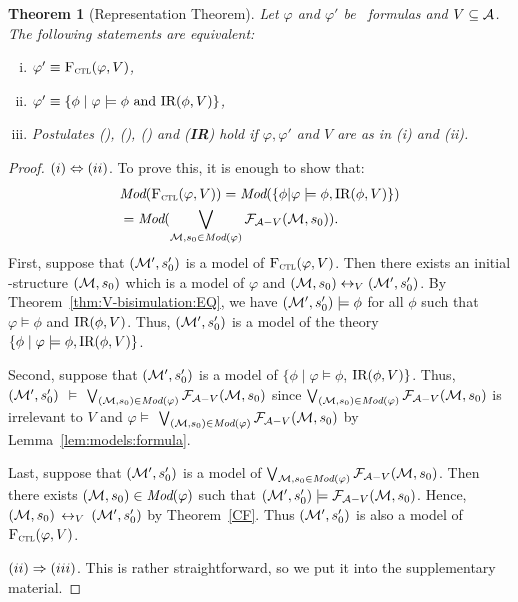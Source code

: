 \documentclass{article}
\newtheorem{theorem}{Theorem}
\begin{document}
\begin{theorem}[Representation Theorem]\label{thm:close}
Let $\varphi$ and $\varphi'$ be \CTL\ formulas and $V \subseteq {\cal A}$.
The following statements are equivalent:
\begin{enumerate}[(i)]
  \item $\varphi' \equiv {\textsc{F}_{\textsc{ctl}}}(\varphi, V)$,
  \item $\varphi'\equiv \{\phi \mid\varphi \models \phi \text{ and } \textrm{IR}(\phi, V)\}$,
  \item Postulates (\W), (\PP), (\NgP) and (\textbf{IR}) hold if $\varphi,   \varphi'$ and $V$ are as in (i) and (ii).
\end{enumerate}
\end{theorem}
\begin{proof}
$(i) \Leftrightarrow (ii)$. To prove this, it is enough to show that:
\begin{align*}
 & \textit{Mod}({\textsc{F}_{\textsc{ctl}}}(\varphi, V)) = \textit{Mod}(\{\phi | \varphi \models \phi, \textrm{IR}(\phi, V)\})\\
 & = \textit{Mod}(\bigvee_{{\cal M}, s_0\in \textit{Mod}(\varphi)} {\cal F}_{{\cal A}- V}({\cal M}, s_0)).
\end{align*}
First, suppose that $({\cal M}', s_0')$ is a model of ${\textsc{F}_{\textsc{ctl}}}(\varphi, V)$. Then there exists an initial \MPK-structure $({\cal M}, s_0)$ which is a model of $\varphi$ and $({\cal M}, s_0) \leftrightarrow_V ({\cal M}', s_0')$. By Theorem~\ref{thm:V-bisimulation:EQ}, we have $({\cal M}', s_0') \models \phi$ for all $\phi$ such that $\varphi\models \phi$ and $\textrm{IR}(\phi, V)$. Thus, $({\cal M}', s_0')$ is a model of the theory $\{\phi \mid \varphi \models \phi, \textrm{IR}(\phi, V)\}$.

Second, suppose that $({\cal M}', s_0')$ is a model of $\{\phi \mid \varphi \models \phi$, $\textrm{IR}(\phi, V)\}$. Thus, $({\cal M}', s_0')$ $\models$ $\bigvee_{({\cal M}, s_0)\in \textit{Mod}(\varphi)} {\cal F}_{{\cal A}- V}({\cal M}, s_0)$ since  $\bigvee_{({\cal M}, s_0)\in \textit{Mod}(\varphi)} {\cal F}_{{\cal A}- V}({\cal M}, s_0)$ is irrelevant to $V$ and $\varphi \models$ $\bigvee_{({\cal M}, s_0)\in \textit{Mod}(\varphi)} {\cal F}_{{\cal A}- V}({\cal M}, s_0)$ by Lemma~\ref{lem:models:formula}.

Last, suppose that $({\cal M}', s_0')$ is a model of $\bigvee_{{\cal M}, s_0\in \textit{Mod}(\varphi)} {\cal F}_{{\cal A}- V}({\cal M}, s_0)$. Then there exists $({\cal M}, s_0) \in \textit{Mod}(\varphi)$ such that $({\cal M}', s_0') \models {\cal F}_{{\cal A}- V}({\cal M}, s_0)$. Hence, $({\cal M}, s_0)$ $\leftrightarrow_V$ $({\cal M}', s_0')$ by Theorem~\ref{CF}. Thus $({\cal M}', s_0')$ is also a model of ${\textsc{F}_{\textsc{ctl}}}(\varphi,V)$.


$(ii)\Rightarrow (iii)$. This is rather straightforward, so we put it into the supplementary material.


\end{proof}
\end{document}
